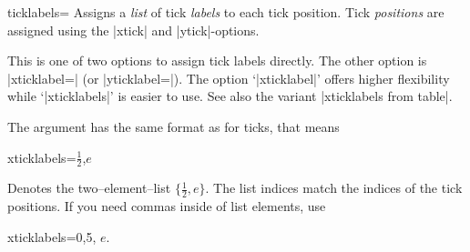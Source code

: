 \begin{pgfplotsxykey}{\x ticklabels=}
\label{pgfplots:key:xticklabels}%
Assigns a \emph{list} of tick \emph{labels} to each tick position. Tick \emph{positions} are assigned using the |xtick| and |ytick|-options.

This is one of two options to assign tick labels directly. The other option is |xticklabel=| (or |yticklabel=|).
The option `|xticklabel|' offers higher flexibility while `|xticklabels|' is easier to use. See also the variant |xticklabels from table|.

The argument  has the same format as for ticks, that means
\begin{codeexample}
xticklabels={$\frac{1}{2}$,$e$}
\end{codeexample}
Denotes the two--element--list $\{\frac 12, e\}$. The list indices match the indices of the tick positions. If you need commas inside of list elements, use 
\begin{codeexample}
xticklabels={{0,5}, $e$}.
\end{codeexample}


\begin{codeexample}[]
\end{codeexample}

\begin{codeexample}[]
\end{codeexample}
\end{pgfplotsxykey}


